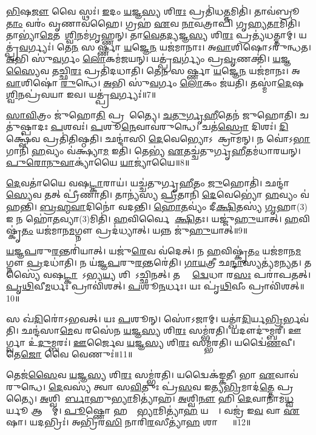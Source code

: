 \ul{𑌭𑌿}𑌷\ul{𑌜𑍗} 𑌵𑍈 𑌸𑍍𑌥𑌃॑। 
\ul{𑌇}𑌦𑌂 \ul{𑌯}𑌜𑍍𑌞\ul{𑌸𑍍𑌯} 𑌶𑌿\ul{𑌰𑌃} 𑌪𑍍𑌰𑌤𑌿॑𑌧\ul{𑌤𑍍𑌤}𑌮𑌿𑌤𑌿॑। 
𑌤𑌾𑌵॑𑌬𑍍𑌰𑍂\ul{𑌤𑌾𑌂} 𑌵𑌰𑌂॑ 𑌵𑍃𑌣𑌾𑌵𑌹𑍈। 
𑌗𑍍𑌰𑌹॑ \ul{𑌏}𑌵 \ul{𑌨𑌾}𑌵𑌤𑍍𑌰𑌾𑌪𑌿॑ 𑌗𑍃𑌹𑍍𑌯\ul{𑌤𑌾}𑌮𑌿𑌤𑌿॑। 
𑌤𑌾𑌭𑍍𑌯𑌾॑\ul{𑌮𑍇}𑌤𑌮𑌾᳚\ul{𑌶𑍍𑌵𑌿}𑌨𑌮॑𑌗𑍃𑌹𑍍𑌣𑌨𑍍। 
𑌤𑌾\ul{𑌵𑍇}𑌤\ul{𑌦𑍍𑌯}𑌜𑍍𑌞\ul{𑌸𑍍𑌯} 𑌶𑌿\ul{𑌰𑌃} 𑌪𑍍𑌰𑌤𑍍𑌯॑𑌧𑌤𑍍𑌤𑌾𑌮𑍍। 
𑌯𑌤𑍍𑌪𑍍𑌰॑\ul{𑌵}𑌰𑍍𑌗𑍍𑌯𑌃॑। 
𑌤𑍇\ul{𑌨} 𑌸𑌶𑍀᳚𑌰𑍍𑌷𑍍𑌣𑌾 \ul{𑌯}𑌜𑍍𑌞𑍇\ul{𑌨} 𑌯𑌜॑𑌮𑌾𑌨𑌾𑌃। 
𑌅\ul{𑌵𑌾}𑌶𑌿𑌷𑍋\-𑌽𑌰𑍁॑𑌨𑍍𑌧𑌤। 
\ul{𑌅}𑌭𑌿 𑌸𑍁॑\ul{𑌵}𑌰𑍍𑌗𑌂 \ul{𑌲𑍋}𑌕𑌮॑𑌜𑌯𑌨𑍍। 
𑌯𑌤𑍍𑌪𑍍𑌰॑\ul{𑌵}𑌰𑍍𑌗𑍍𑌯𑌂॑ 𑌪𑍍𑌰\ul{𑌵𑍃}𑌣𑌕𑍍𑌤𑌿॑। 
\ul{𑌯}𑌜𑍍𑌞\ul{𑌸𑍍𑌯𑍈}𑌵 𑌤𑌚𑍍𑌛𑌿\ul{𑌰𑌃} 𑌪𑍍𑌰𑌤𑌿॑𑌦𑌧𑌾𑌤𑌿। 
𑌤𑍇\ul{𑌨} 𑌸𑌶𑍀᳚𑌰𑍍𑌷𑍍𑌣𑌾 \ul{𑌯}𑌜𑍍𑌞𑍇\ul{𑌨} 𑌯𑌜॑𑌮𑌾𑌨𑌃। 
𑌅\ul{𑌵𑌾}𑌶𑌿𑌷𑍋॑ \ul{𑌰𑍁}𑌨𑍍𑌧𑍇। 
\ul{𑌅}𑌭𑌿 𑌸𑍁॑\ul{𑌵}𑌰𑍍𑌗𑌂 \ul{𑌲𑍋}𑌕𑌂 𑌜॑𑌯𑌤𑌿। 
𑌤𑌸𑍍𑌮𑌾॑\ul{𑌦𑍇}𑌷 𑌆᳚\ul{𑌶𑍍𑌵𑌿}𑌨𑌪𑍍𑌰॑𑌵𑌯𑌾 𑌇𑌵। 
𑌯𑌤𑍍𑌪𑍍𑌰॑\ul{𑌵}𑌰𑍍𑌗𑍍𑌯𑌃॑॥7॥
\anuvakamend[\ul{𑌉}\ul{𑌤𑍍𑌕}𑌰𑍋 𑌹𑍍𑌯𑍇॑𑌤𑍇 𑌤𑍃॑𑌨𑍍𑌦𑌨𑍍𑌤𑌿 𑌮𑌹𑌾𑌵𑍀\ul{𑌰}𑌤𑍍𑌵𑌮॑𑌬𑍍𑌰𑍁𑌵𑌨𑍍𑌨𑌜𑌯\ul{𑌨𑍍𑌥𑍍𑌸}𑌪𑍍𑌤 𑌚॑]

\ul{𑌸𑌾}\ul{𑌵𑌿}𑌤𑍍𑌰𑌂 𑌜𑍁॑𑌹𑍋\ul{𑌤𑌿} 𑌪𑍍𑌰𑌸𑍂᳚𑌤𑍍𑌯𑍈। 
\ul{𑌚}\ul{𑌤𑍁}\ul{𑌰𑍍𑌗𑍃}\ul{𑌹𑍀}𑌤𑍇𑌨॑ 𑌜𑍁𑌹𑍋𑌤𑌿। 
𑌚𑌤𑍁॑𑌷𑍍𑌪𑌾𑌦𑌃 \ul{𑌪}𑌶𑌵𑌃॑। 
\ul{𑌪}𑌶𑍂\ul{𑌨𑍇}𑌵𑌾𑌵॑𑌰𑍁𑌨𑍍𑌧𑍇। 
𑌚𑌤॑\ul{𑌸𑍍𑌰𑍋} 𑌦𑌿𑌶𑌃॑। 
\ul{𑌦𑌿}𑌕𑍍𑌷𑍍𑌵𑍇॑𑌵 𑌪𑍍𑌰𑌤𑌿॑𑌤𑌿𑌷𑍍𑌠𑌤𑌿। 
𑌛𑌨𑍍𑌦𑌾॑𑌸𑌿 \ul{𑌦𑍇}𑌵𑍇𑌭𑍍𑌯𑍋𑌽𑌪𑌾᳚𑌕𑍍𑌰𑌾𑌮𑌨𑍍। 
𑌨 𑌵𑍋॑𑌽\ul{𑌭𑌾}𑌗𑌾𑌨𑌿॑ \ul{𑌹}𑌵𑍍𑌯𑌂 𑌵॑𑌕𑍍𑌷𑍍𑌯𑌾\ul{𑌮} 𑌇𑌤𑌿॑। 
𑌤𑍇𑌭𑍍𑌯॑ \ul{𑌏}𑌤𑌚𑍍𑌚॑𑌤𑍁𑌰𑍍𑌗𑍃\ul{𑌹𑍀}𑌤𑌮॑𑌧𑌾𑌰𑌯𑌨𑍍। 
\ul{𑌪𑍁}\ul{𑌰𑍋}\ul{𑌨𑍁}\ul{𑌵𑌾}𑌕𑍍𑌯𑌾॑𑌯𑍈 \ul{𑌯𑌾}𑌜𑍍𑌯𑌾॑𑌯𑍈॥8॥

\ul{𑌦𑍇}𑌵𑌤𑌾॑𑌯𑍈 𑌵𑌷\ul{𑌟𑍍𑌕𑌾}𑌰𑌾𑌯॑। 
𑌯𑌚𑍍𑌚॑𑌤𑍁𑌰𑍍𑌗𑍃\ul{𑌹𑍀}𑌤𑌂 \ul{𑌜𑍁}𑌹𑍋𑌤𑌿॑। 
𑌛𑌨𑍍𑌦𑌾॑\ul{𑌸𑍍𑌯𑍇}𑌵 𑌤𑌤𑍍 𑌪𑍍𑌰𑍀॑𑌣𑌾𑌤𑌿। 
𑌤𑌾𑌨𑍍𑌯॑𑌸𑍍𑌯 \ul{𑌪𑍍𑌰𑍀}𑌤𑌾𑌨𑌿॑ \ul{𑌦𑍇}𑌵𑍇𑌭𑍍𑌯𑍋॑ \ul{𑌹}𑌵𑍍𑌯𑌂 𑌵॑𑌹𑌨𑍍𑌤𑌿। 
\ul{𑌬𑍍𑌰}\ul{𑌹𑍍𑌮}\ul{𑌵𑌾}𑌦𑌿𑌨𑍋॑ 𑌵𑌦𑌨𑍍𑌤𑌿। 
\ul{𑌹𑍋}\ul{𑌤}𑌵𑍍𑌯𑌂॑ 𑌦𑍀\ul{𑌕𑍍𑌷𑌿}𑌤𑌸𑍍𑌯॑ \ul{𑌗𑍃}𑌹𑌾(3)𑌇 𑌨 𑌹𑍋॑\ul{𑌤}𑌵𑍍𑌯𑌾(3)𑌮𑌿𑌤𑌿॑। 
\ul{𑌹}𑌵𑌿𑌰𑍍\mbox{}𑌵𑍈 𑌦𑍀᳚\ul{𑌕𑍍𑌷𑌿}𑌤𑌃। 
𑌯𑌜𑍍𑌜𑍁॑\ul{𑌹𑍁}𑌯𑌾𑌤𑍍। 
\ul{𑌹}𑌵𑌿𑌷𑍍𑌕𑍃॑\ul{𑌤𑌂} 𑌯𑌜॑𑌮𑌾𑌨\ul{𑌮}𑌗𑍍𑌨𑍗 𑌪𑍍𑌰𑌦॑𑌧𑍍𑌯𑌾𑌤𑍍। 
𑌯𑌨𑍍𑌨 𑌜𑍁॑\ul{𑌹𑍁}𑌯𑌾𑌤𑍍॥9॥

\ul{𑌯}\ul{𑌜𑍍𑌞}\ul{𑌪}𑌰𑍁\ul{𑌰}𑌨𑍍𑌤𑌰𑌿॑𑌯𑌾𑌤𑍍। 
𑌯𑌜𑍁॑\ul{𑌰𑍇}𑌵 𑌵॑𑌦𑍇𑌤𑍍। 
𑌨 \ul{𑌹}𑌵𑌿𑌷𑍍𑌕𑍃॑\ul{𑌤𑌂} 𑌯𑌜॑𑌮𑌾𑌨\ul{𑌮}𑌗𑍍𑌨𑍗 \ul{𑌪𑍍𑌰}𑌦𑌧𑌾॑𑌤𑌿। 
𑌨 𑌯॑𑌜𑍍𑌞\ul{𑌪}𑌰𑍁\ul{𑌰}𑌨𑍍𑌤𑌰𑍇॑𑌤𑌿। 
\ul{𑌗𑌾}\ul{𑌯}𑌤𑍍𑌰𑍀 𑌛\ul{𑌨𑍍𑌦𑌾}\ul{}𑌸𑍍𑌯𑌤𑍍𑌯॑𑌮𑌨𑍍𑌯𑌤। 
𑌤𑌸𑍍𑌯𑍈॑ 𑌵𑌷\ul{𑌟𑍍𑌕𑌾}𑌰𑍋᳚𑌽𑌭𑍍𑌯\ul{𑌯𑍍𑌯} 𑌶𑌿𑌰𑍋᳚𑌽𑌚𑍍𑌛𑌿𑌨𑌤𑍍। 
𑌤𑌸𑍍𑌯𑍈᳚ \ul{𑌦𑍍𑌵𑍇}𑌧𑌾 𑌰\ul{𑌸𑌃} 𑌪𑌰𑌾॑𑌪𑌤𑌤𑍍। 
\ul{𑌪𑍃}\ul{𑌥𑌿}𑌵𑍀\ul{𑌮}𑌰𑍍𑌧𑌃 𑌪𑍍𑌰𑌾𑌵𑌿॑𑌶𑌤𑍍। 
\ul{𑌪}𑌶𑍂\ul{𑌨}𑌰𑍍𑌧𑌃। 
𑌯𑌃 𑌪𑍃॑\ul{𑌥𑌿}𑌵𑍀𑌂 𑌪𑍍𑌰𑌾𑌵𑌿॑𑌶𑌤𑍍॥10॥

𑌸 𑌖॑\ul{𑌦𑌿}𑌰𑍋॑𑌽𑌭𑌵𑌤𑍍। 
𑌯𑌃 \ul{𑌪}𑌶𑍂𑌨𑍍। 
𑌸𑍋॑𑌽𑌜𑌾𑌮𑍍। 
𑌯𑌤𑍍𑌖𑌾॑\ul{𑌦𑌿}𑌰𑍍𑌯\ul{𑌭𑍍𑌰𑌿}𑌰𑍍𑌭\-𑌵॑𑌤𑌿। 
𑌛𑌨𑍍𑌦॑𑌸𑌾\ul{𑌮𑍇}𑌵 𑌰𑌸𑍇॑𑌨 \ul{𑌯}𑌜𑍍𑌞\ul{𑌸𑍍𑌯} 𑌶𑌿\ul{𑌰𑌃} 𑌸𑌮𑍍𑌭॑𑌰𑌤𑌿। 
𑌯𑌦𑍗𑌦𑍁॑𑌮𑍍𑌬𑌰𑍀। 
𑌊𑌰𑍍𑌗𑍍𑌵𑌾 𑌉॑\ul{𑌦𑍁}𑌮𑍍𑌬𑌰𑌃॑। 
\ul{𑌊}𑌰𑍍𑌜𑍈𑌵 \ul{𑌯}𑌜𑍍𑌞\ul{𑌸𑍍𑌯} 𑌶𑌿\ul{𑌰𑌃} 𑌸𑌮𑍍𑌭॑𑌰𑌤𑌿। 
𑌯𑌦𑍍𑌵𑍈॑\ul{𑌣}𑌵𑍀। 
𑌤𑍇\ul{𑌜𑍋} 𑌵𑍈 𑌵𑍇𑌣𑍁𑌃॑॥11॥

𑌤𑍇𑌜॑\ul{𑌸𑍈}𑌵 \ul{𑌯}𑌜𑍍𑌞\ul{𑌸𑍍𑌯} 𑌶𑌿\ul{𑌰𑌃} 𑌸𑌮𑍍𑌭॑𑌰𑌤𑌿। 
𑌯𑌦𑍍𑌵𑍈𑌕॑𑌙𑍍𑌕𑌤𑍀। 
𑌭𑌾 \ul{𑌏}𑌵𑌾𑌵॑𑌰𑍁𑌨𑍍𑌧𑍇। 
\ul{𑌦𑍇}𑌵𑌸𑍍𑌯॑ 𑌤𑍍𑌵𑌾 𑌸\ul{𑌵𑌿}𑌤𑍁𑌃 𑌪𑍍𑌰॑\ul{𑌸}𑌵 𑌇𑌤𑍍𑌯\ul{𑌭𑍍𑌰𑌿}𑌮𑌾𑌦॑\ul{𑌤𑍍𑌤𑍇} 𑌪𑍍𑌰𑌸𑍂᳚𑌤𑍍𑌯𑍈। 
\ul{𑌅}𑌶𑍍𑌵𑌿𑌨𑍋᳚\ul{𑌰𑍍𑌬𑌾}𑌹𑍁\ul{𑌭𑍍𑌯𑌾}\-𑌮𑌿𑌤𑍍𑌯𑌾॑𑌹। 
\ul{𑌅}𑌶𑍍𑌵𑌿\ul{𑌨𑍗} 𑌹𑌿 \ul{𑌦𑍇}𑌵𑌾𑌨𑌾॑𑌮\ul{𑌧𑍍𑌵}𑌰𑍍𑌯𑍂 𑌆𑌸𑍍𑌤𑌾᳚𑌮𑍍। 
\ul{𑌪𑍂}𑌷𑍍𑌣𑍋 𑌹𑌸𑍍𑌤𑌾᳚\ul{𑌭𑍍𑌯𑌾}𑌮𑌿𑌤𑍍𑌯𑌾॑\ul{𑌹} 𑌯𑌤𑍍𑌯𑍈᳚। 
𑌵𑌜𑍍𑌰॑ 𑌇\ul{𑌵} 𑌵𑌾 \ul{𑌏}𑌷𑌾। 
𑌯𑌦𑌭𑍍𑌰𑌿𑌃॑। 
𑌅𑌭𑍍𑌰𑌿॑𑌰\ul{𑌸𑌿} 𑌨𑌾𑌰𑌿॑\ul{𑌰}𑌸𑍀𑌤𑍍𑌯𑌾॑\ul{𑌹} 𑌶𑌾𑌨𑍍𑌤𑍍𑌯𑍈᳚॥12॥

